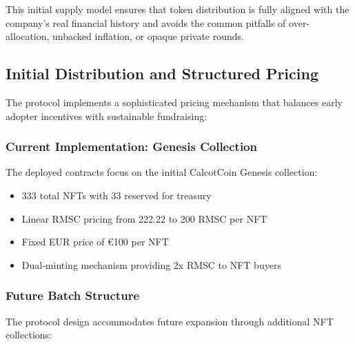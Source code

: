 \documentclass[conference]{IEEEtran}
\begin{document}
This initial supply model ensures that token distribution is fully aligned with the company’s real financial history and avoids the common pitfalls of over-allocation, unbacked inflation, or opaque private rounds.

\subsection{Initial Distribution and Structured Pricing}

The protocol implements a sophisticated pricing mechanism that balances early adopter incentives with sustainable fundraising:

\subsubsection{Current Implementation: Genesis Collection}

The deployed contracts focus on the initial CalcotCoin Genesis collection:
\begin{itemize}
    \item 333 total NFTs with 33 reserved for treasury
    \item Linear RMSC pricing from 222.22 to 200 RMSC per NFT
    \item Fixed EUR price of €100 per NFT
    \item Dual-minting mechanism providing 2x RMSC to NFT buyers
\end{itemize}

\subsubsection{Future Batch Structure}

The protocol design accommodates future expansion through additional NFT collections:
\end{document}
